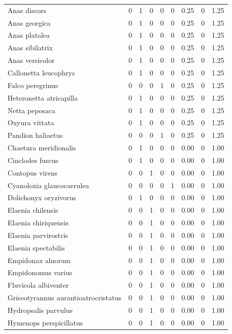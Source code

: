 \documentclass[
]{scrbook}
\begin{document}
\begin{table}
\begin{tabular}{lrrrrrrrr}
Anas discors & 0 & 1 & 0 & 0 & 0 & 0.25 & 0 & 1.25\\
Anas georgica & 0 & 1 & 0 & 0 & 0 & 0.25 & 0 & 1.25\\
Anas platalea & 0 & 1 & 0 & 0 & 0 & 0.25 & 0 & 1.25\\
\addlinespace
Anas sibilatrix & 0 & 1 & 0 & 0 & 0 & 0.25 & 0 & 1.25\\
Anas versicolor & 0 & 1 & 0 & 0 & 0 & 0.25 & 0 & 1.25\\
Callonetta leucophrys & 0 & 1 & 0 & 0 & 0 & 0.25 & 0 & 1.25\\
Falco peregrinus & 0 & 0 & 0 & 1 & 0 & 0.25 & 0 & 1.25\\
Heteronetta atricapilla & 0 & 1 & 0 & 0 & 0 & 0.25 & 0 & 1.25\\
\addlinespace
Netta peposaca & 0 & 1 & 0 & 0 & 0 & 0.25 & 0 & 1.25\\
Oxyura vittata & 0 & 1 & 0 & 0 & 0 & 0.25 & 0 & 1.25\\
Pandion haliaetus & 0 & 0 & 0 & 1 & 0 & 0.25 & 0 & 1.25\\
Chaetura meridionalis & 0 & 1 & 0 & 0 & 0 & 0.00 & 0 & 1.00\\
Cinclodes fuscus & 0 & 1 & 0 & 0 & 0 & 0.00 & 0 & 1.00\\
\addlinespace
Contopus virens & 0 & 0 & 1 & 0 & 0 & 0.00 & 0 & 1.00\\
Cyanoloxia glaucocaerulea & 0 & 0 & 0 & 0 & 1 & 0.00 & 0 & 1.00\\
Dolichonyx oryzivorus & 0 & 1 & 0 & 0 & 0 & 0.00 & 0 & 1.00\\
Elaenia chilensis & 0 & 0 & 1 & 0 & 0 & 0.00 & 0 & 1.00\\
Elaenia chiriquensis & 0 & 0 & 1 & 0 & 0 & 0.00 & 0 & 1.00\\
\addlinespace
Elaenia parvirostris & 0 & 0 & 1 & 0 & 0 & 0.00 & 0 & 1.00\\
Elaenia spectabilis & 0 & 0 & 1 & 0 & 0 & 0.00 & 0 & 1.00\\
Empidonax alnorum & 0 & 0 & 1 & 0 & 0 & 0.00 & 0 & 1.00\\
Empidonomus varius & 0 & 0 & 1 & 0 & 0 & 0.00 & 0 & 1.00\\
Fluvicola albiventer & 0 & 0 & 1 & 0 & 0 & 0.00 & 0 & 1.00\\
\addlinespace
Griseotyrannus aurantioatrocristatus & 0 & 0 & 1 & 0 & 0 & 0.00 & 0 & 1.00\\
Hydropsalis parvulus & 0 & 0 & 1 & 0 & 0 & 0.00 & 0 & 1.00\\
Hymenops perspicillatus & 0 & 0 & 1 & 0 & 0 & 0.00 & 0 & 1.00\\

\end{tabular}
\end{table}
\end{document}
